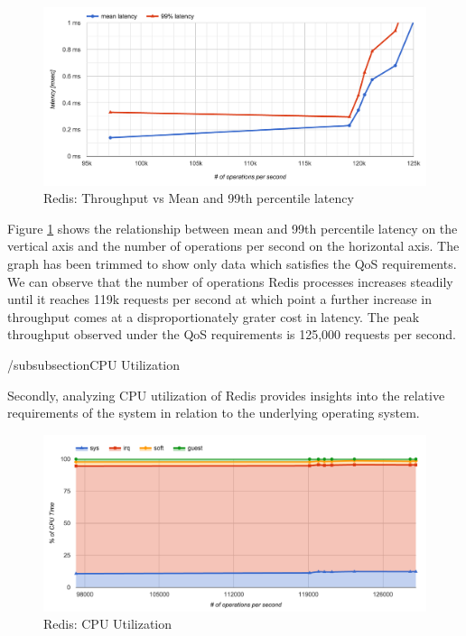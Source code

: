\begin{figure}[h]
    \includegraphics[width=\textwidth]{./res/6_default_latency_ops.png}
    \caption{Redis: Throughput vs Mean and 99th percentile latency}
    \label{fig:redis-default-latency-ops}
\end{figure}

Figure \ref{fig:redis-default-latency-ops} shows the relationship between mean and 99th percentile latency on the vertical axis and the number of operations per second on the horizontal axis. The graph has been trimmed to show only data which satisfies the QoS requirements. We can observe that the number of operations Redis processes increases steadily until it reaches 119k requests per second at which point a further increase in throughput comes at a disproportionately grater cost in latency. The peak throughput observed under the QoS requirements is 125,000 requests per second.

/subsubsection{CPU Utilization}

Secondly, analyzing CPU utilization of Redis provides insights into the relative requirements of the system in relation to the underlying operating system.

\begin{figure}[h]
    \includegraphics[width=\textwidth]{./res/6_default_cpu.png}
    \caption{Redis: CPU Utilization}
    \label{fig:redis-default-cpu}
\end{figure}

